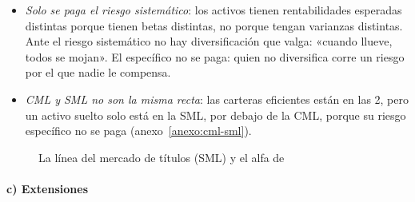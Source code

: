 \documentclass[11pt]{article}
\begin{document}
\begin{itemize}
\begin{itemize}
  \end{itemize}
\item \emph{Solo se paga el riesgo sistemático}: los activos tienen rentabilidades esperadas distintas porque tienen betas distintas, no porque tengan varianzas distintas. Ante el riesgo sistemático no hay diversificación que valga: «cuando llueve, todos se mojan». El específico no se paga: quien no diversifica corre un riesgo por el que nadie le compensa.
\item \emph{CML y SML no son la misma recta}: las carteras eficientes están en las 2, pero un activo suelto solo está en la SML, por debajo de la CML, porque su riesgo específico no se paga (anexo~\ref{anexo:cml-sml}).
\end{itemize}
\begin{figure}[H]
\centering
\caption{La línea del mercado de títulos (SML) y el alfa de }\label{fig:sml}
\end{figure}

\paragraph{c) Extensiones}
\end{document}
